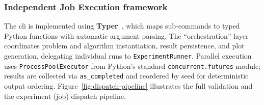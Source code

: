 
\subsubsection{Independent Job Execution framework}

The \acrshort{cli} is implemented using \textbf{Typer}~\cite{typer}, which maps
sub-commands to typed Python functions with automatic argument parsing. The
``orchestration'' layer coordinates
problem and algorithm instantiation, result persistence, and plot
generation, delegating individual runs to \texttt{ExperimentRunner}. Parallel
execution uses \texttt{ProcessPoolExecutor} from Python's standard
\texttt{concurrent.futures} module; results are collected via
\texttt{as\_completed} and reordered by seed for deterministic output
ordering. Figure~\ref{fig:dispatch-pipeline} illustrates the full validation
and the experiment (job) dispatch pipeline.

